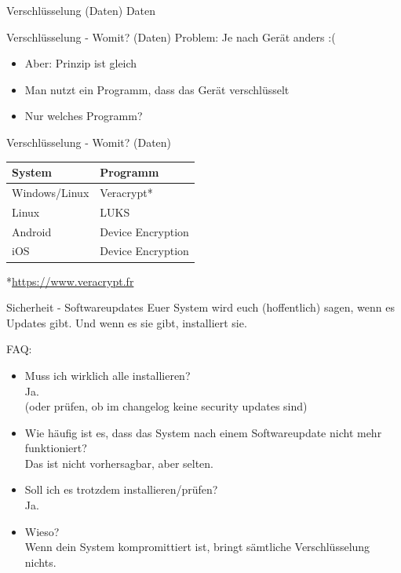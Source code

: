 \documentclass{beamer}
\begin{document}
\begin{frame}{Verschlüsselung (Daten)}
    \center\huge{Daten}               
\end{frame}                           

\begin{frame}{Verschlüsselung - Womit? (Daten)}
	Problem: Je nach Gerät anders :(
    \begin{itemize}
    	\item Aber: Prinzip ist gleich
    	\item Man nutzt ein Programm, dass das Gerät verschlüsselt
    	\item Nur welches Programm?
    \end{itemize}
\end{frame}

\begin{frame}{Verschlüsselung - Womit? (Daten)}
\begin{tabular}{ l | l }
	System & Programm \\\hline
	Windows/Linux & Veracrypt* \\
	Linux & LUKS \\
	Android & Device Encryption \\
	iOS & Device Encryption  \\
\end{tabular}

\hspace{2cm}

*\small{\url{https://www.veracrypt.fr}}
	
\end{frame}

\begin{frame} {Sicherheit - Softwareupdates}
	Euer System wird euch (hoffentlich) sagen, wenn es Updates gibt. Und wenn es sie gibt, installiert sie.
	\\\hspace{1cm}
	
	FAQ:
	\begin{itemize}
		\item Muss ich wirklich alle installieren? \pause
		\\ Ja. \pause
		\\ (oder prüfen, ob im changelog keine security updates sind) \pause
		\item Wie häufig ist es, dass das System nach einem Softwareupdate nicht mehr funktioniert? \pause
		\\ Das ist nicht vorhersagbar, aber selten. \pause
		\item Soll ich es trotzdem installieren/prüfen? \pause
		\\ Ja. \pause
		\item Wieso? \pause
		\\ Wenn dein System kompromittiert ist, bringt sämtliche Verschlüsselung nichts.
	\end{itemize}
\end{frame}
\end{document}

